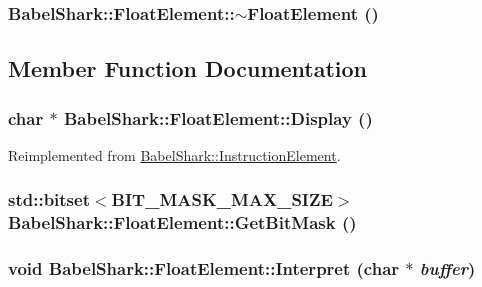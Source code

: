 \hypertarget{class_babel_shark_1_1_float_element_147f0c9260a5470c27249effcc0e3211}{
\subsubsection[{$\sim$FloatElement}]{\setlength{\rightskip}{0pt plus 5cm}BabelShark::FloatElement::$\sim$FloatElement ()}}
\label{class_babel_shark_1_1_float_element_147f0c9260a5470c27249effcc0e3211}




\subsection{Member Function Documentation}
\hypertarget{class_babel_shark_1_1_float_element_7c8e429b760e1e24985e3046d4640674}{
\subsubsection[{Display}]{\setlength{\rightskip}{0pt plus 5cm}char $\ast$ BabelShark::FloatElement::Display ()}}
\label{class_babel_shark_1_1_float_element_7c8e429b760e1e24985e3046d4640674}




Reimplemented from \hyperlink{class_babel_shark_1_1_instruction_element_6c98ad187a2a12399eb90a8cf9e2aec0}{BabelShark::InstructionElement}.\hypertarget{class_babel_shark_1_1_float_element_9049dc22f918d2c3aebf630c5ece954b}{
\subsubsection[{GetBitMask}]{\setlength{\rightskip}{0pt plus 5cm}std::bitset$<$BIT\_\-MASK\_\-MAX\_\-SIZE$>$ BabelShark::FloatElement::GetBitMask ()}}
\label{class_babel_shark_1_1_float_element_9049dc22f918d2c3aebf630c5ece954b}


\hypertarget{class_babel_shark_1_1_float_element_8431ada746a028580cccdadc83538793}{
\subsubsection[{Interpret}]{\setlength{\rightskip}{0pt plus 5cm}void BabelShark::FloatElement::Interpret (char $\ast$ {\em buffer})}}
\label{class_babel_shark_1_1_float_element_8431ada746a028580cccdadc83538793}




